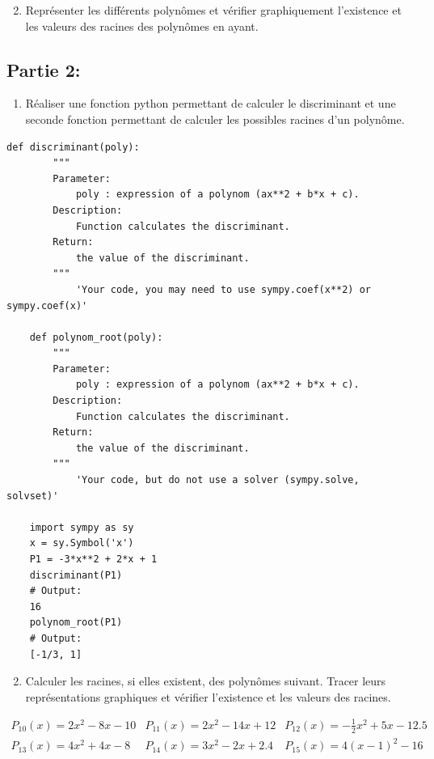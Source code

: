 \documentclass[11pt, french]{article}
\begin{document}
\begin{enumerate}
    \setcounter{enumi}{1}
    \item Représenter les différents polynômes et vérifier graphiquement l'existence et les valeurs des racines des polynômes en ayant.
\end{enumerate}

\subsection*{Partie 2:}
\begin{enumerate}
    \item Réaliser une fonction python permettant de calculer le discriminant et une seconde fonction permettant de calculer les possibles racines d'un polynôme.
\end{enumerate}
\begin{lstlisting}[style=nightly]
    def discriminant(poly):
        """
        Parameter:
            poly : expression of a polynom (ax**2 + b*x + c).
        Description:
            Function calculates the discriminant.
        Return:
            the value of the discriminant.
        """
            'Your code, you may need to use sympy.coef(x**2) or sympy.coef(x)'
    
    def polynom_root(poly):
        """
        Parameter:
            poly : expression of a polynom (ax**2 + b*x + c).
        Description:
            Function calculates the discriminant.
        Return:
            the value of the discriminant.
        """
            'Your code, but do not use a solver (sympy.solve, solvset)' 
    
    import sympy as sy
    x = sy.Symbol('x')
    P1 = -3*x**2 + 2*x + 1
    discriminant(P1)
    # Output:
    16
    polynom_root(P1)
    # Output:
    [-1/3, 1]
\end{lstlisting}

\begin{enumerate}
    \setcounter{enumi}{1}
    \item Calculer les racines, si elles existent, des polynômes suivant. Tracer leurs représentations graphiques et vérifier l'existence et les valeurs des racines.
\end{enumerate}
\begin{equation*}
    \begin{matrix}
    P_{10}(x) = 2x^2 - 8x -10  & P_{11}(x) = 2x^2 -14x + 12 & P_{12}(x) = -\frac{1}{2}x^2 + 5x -12.5  \\
    P_{13}(x) = 4x^2 + 4x - 8 & P_{14}(x) = 3x^2 - 2x +2.4  & P_{15}(x) = 4(x-1)^2-16
    \end{matrix}
\end{equation*}
\vspace{1cm}
\end{document}
